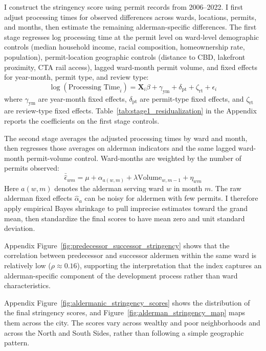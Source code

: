 I construct the stringency score using permit records from 2006--2022.
I first adjust processing times for observed differences across wards, locations, permits, and months, then estimate the remaining alderman-specific differences.
The first stage regresses log processing time at the permit level on ward-level demographic controls (median household income, racial composition, homeownership rate, population), permit-location geographic controls (distance to CBD, lakefront proximity, CTA rail access), lagged ward-month permit volume, and fixed effects for year-month, permit type, and review type:
%
\begin{equation} \label{eq:stringency_reg1}
    \log(\text{Processing Time}_{i}) = \mathbf{X}_i \beta + \gamma_{\text{ym}} + \delta_{\text{pt}} + \zeta_{\text{rt}} + \epsilon_{i}
\end{equation}
%
where $\gamma_{\text{ym}}$ are year-month fixed effects, $\delta_{\text{pt}}$ are permit-type fixed effects, and $\zeta_{\text{rt}}$ are review-type fixed effects.
Table~\ref{tab:stage1_residualization} in the Appendix reports the coefficients on the first stage controls.

The second stage averages the adjusted processing times by ward and month, then regresses those averages on alderman indicators and the same lagged ward-month permit-volume control.
Ward-months are weighted by the number of permits observed:
%
\begin{equation} \label{eq:stringency_reg2}
    \bar{\hat{\epsilon}}_{wm} = \mu + \alpha_{a(w,m)} + \lambda \text{Volume}_{w,m-1} + \eta_{wm}
\end{equation}
%
Here $a(w,m)$ denotes the alderman serving ward $w$ in month $m$.
The raw alderman fixed effects $\hat{\alpha}_a$ can be noisy for aldermen with few permits.
I therefore apply empirical Bayes shrinkage \citep{kline_systemic_2022, kline_discrimination_2024} to pull imprecise estimates toward the grand mean, then standardize the final scores to have mean zero and unit standard deviation.

Appendix Figure~\ref{fig:predecessor_successor_stringency} shows that the correlation between predecessor and successor aldermen within the same ward is relatively low ($\rho \approx 0.16$), supporting the interpretation that the index captures an alderman-specific component of the development process rather than ward characteristics.

Appendix Figure~\ref{fig:aldermanic_stringency_scores} shows the distribution of the final stringency scores, and Figure~\ref{fig:alderman_stringency_map} maps them across the city.
The scores vary across wealthy and poor neighborhoods and across the North and South Sides, rather than following a simple geographic pattern.


